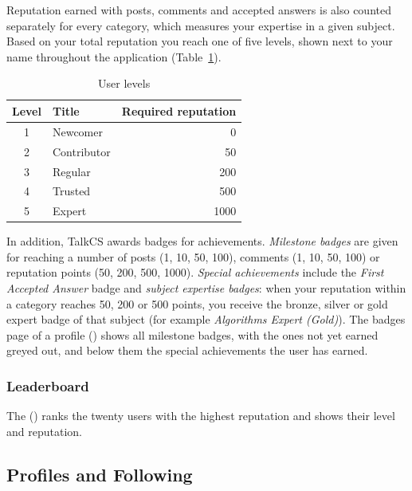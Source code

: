Reputation earned with posts, comments and accepted answers is also counted separately
for every category, which measures your expertise in a given subject. Based on your
total reputation you reach one of five levels, shown next to your name throughout the
application (Table~\ref{tab:levels}).

\begin{table}[H]
  \centering
  \small
  \begin{tabular}{@{}c l r@{}}
    \toprule
    \textbf{Level} & \textbf{Title} & \textbf{Required reputation} \\
    \midrule
    1 & Newcomer & 0 \\
    2 & Contributor & 50 \\
    3 & Regular & 200 \\
    4 & Trusted & 500 \\
    5 & Expert & 1000 \\
    \bottomrule
  \end{tabular}
  \caption{User levels}
  \label{tab:levels}
\end{table}

In addition, TalkCS awards badges for achievements. \emph{Milestone badges} are given
for reaching a number of posts (1, 10, 50, 100), comments (1, 10, 50, 100) or
reputation points (50, 200, 500, 1000). \emph{Special achievements} include the
\emph{First Accepted Answer} badge and \emph{subject expertise badges}: when your
reputation within a category reaches 50, 200 or 500 points, you receive the bronze,
silver or gold expert badge of that subject (for example \emph{Algorithms Expert
(Gold)}). The badges page of a profile () shows all
milestone badges, with the ones not yet earned greyed out, and below them the special
achievements the user has earned.


\subsubsection*{Leaderboard}

The  () ranks the twenty users with the highest
reputation and shows their level and reputation.


\subsection{Profiles and Following}

